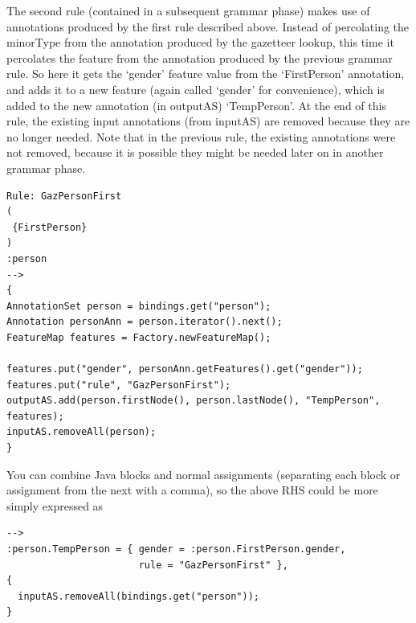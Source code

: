 The second rule (contained in a subsequent grammar phase) makes use of
annotations produced by the first rule described above. Instead of
percolating the minorType from the annotation produced by the
gazetteer lookup, this time it percolates the feature from the
annotation produced by the previous grammar rule. So here it gets the
`gender' feature value from the `FirstPerson' annotation, and adds it to
a new feature (again called `gender' for convenience), which is
added to the new annotation (in outputAS) `TempPerson'. At the end of this rule,
the existing input annotations (from inputAS) are removed because they are no longer
needed. Note that in the previous rule, the existing annotations were
not removed, because it is possible they might be needed later on in
another grammar phase.


\begin{small}
\begin{verbatim}
Rule: GazPersonFirst
(
 {FirstPerson}
)
:person
-->
{
AnnotationSet person = bindings.get("person");
Annotation personAnn = person.iterator().next();
FeatureMap features = Factory.newFeatureMap();

features.put("gender", personAnn.getFeatures().get("gender"));
features.put("rule", "GazPersonFirst");
outputAS.add(person.firstNode(), person.lastNode(), "TempPerson",
features);
inputAS.removeAll(person);
}
\end{verbatim}
\end{small}

You can combine Java blocks and normal assignments (separating each block or
assignment from the next with a comma), so the above RHS could be more
simply expressed as

\begin{small}
\begin{verbatim}
-->
:person.TempPerson = { gender = :person.FirstPerson.gender,
                       rule = "GazPersonFirst" },
{
  inputAS.removeAll(bindings.get("person"));
}
\end{verbatim}
\end{small}



